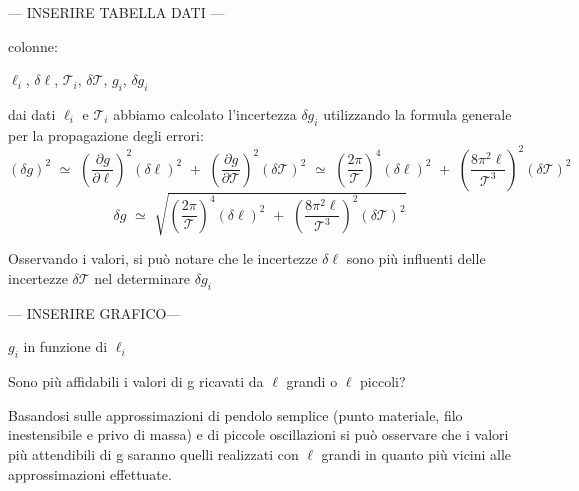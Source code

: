 \begin{center}
--- INSERIRE TABELLA DATI ---

colonne:

$\ell_i$, $\delta\ell$, $\mathcal{T}_i$, $\delta\mathcal{T}$, $g_i$, $\delta g_i$
\end{center}

dai dati $\ell_i$ e $\mathcal{T}_i$ abbiamo calcolato l'incertezza $\delta g_i$ utilizzando la formula generale per la propagazione degli errori:
\begin{equation}
	(\delta g)^2 \,\, \simeq \,\, \left( \frac{\partial g}{\partial \ell} \right)^2 (\delta \ell)^2 \,\, + \,\, \left( \frac{\partial g}{\partial \mathcal{T}} \right)^2 (\delta \mathcal{T})^2 \,\, \simeq \,\, \left( \frac{2 \pi}{\mathcal{T}} \right)^4 (\delta \ell)^2 \,\, + \,\, \left( \frac{8 \pi^2 \ell}{\mathcal{T}^3} \right)^2 (\delta \mathcal{T})^2
\end{equation}
\begin{equation*}
	\delta g \,\, \simeq \,\, \sqrt{\left( \frac{2 \pi}{\mathcal{T}} \right)^4 (\delta \ell)^2 \,\, + \,\, \left( \frac{8 \pi^2 \ell}{\mathcal{T}^3} \right)^2 (\delta \mathcal{T})^2}
\end{equation*}

Osservando i valori, si può notare che le incertezze $\delta\ell$ sono più influenti delle incertezze $\delta\mathcal{T}$ nel determinare $\delta g_i$

\begin{center}
--- INSERIRE GRAFICO---

$g_i$ in funzione di $\ell_i$ 
\end{center}

Sono più affidabili i valori di g ricavati da $\ell$ grandi o $\ell$ piccoli?

Basandosi sulle approssimazioni di pendolo semplice (punto materiale, filo inestensibile e privo di massa) e di piccole oscillazioni si può osservare che i valori più attendibili di g saranno quelli realizzati con $\ell$ grandi in quanto più vicini alle approssimazioni effettuate.
